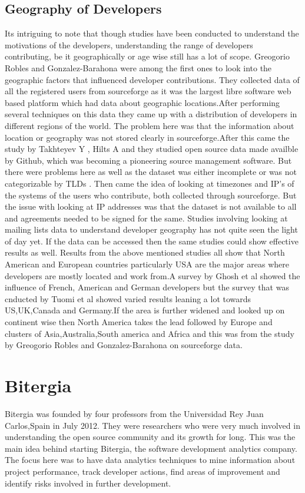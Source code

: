 \documentclass[double,12pt]{beavtex}
\begin{document}
\section{Geography of Developers}
Its intriguing to note that though studies have been conducted to understand the motivations of the developers, understanding the range of developers contributing, be it geographically or age wise still has a lot of scope. Greogorio Robles and Gonzalez-Barahona were among the first ones to look into the geographic factors that influenced developer contributions. They collected data of all the registered users from sourceforge as it was the largest libre software web based platform which had data about geographic locations.After performing several techniques on this data they came up with a distribution of developers in different regions of the world\cite{robles2006}. The problem here was that the information about location or geography was not stored clearly in sourceforge.After this came the study by Takhteyev Y , Hilts A and they studied open source data made availble by Github, which was becoming a pioneering source management software. But there were problems here as well as the dataset was either incomplete or was not categorizable by TLDs \cite{yuri2010}. Then came the idea of looking at timezones and IP's of the systems of the users who contribute, both collected through sourceforge. But the issue with looking at IP addresses was that the dataset is not available to all and agreements needed to be signed for the same\cite{von2010}. Studies involving looking at mailing lists data to understand developer geography has not quite seen the light of day yet. If the data can be accessed then the same studies could show effective results as well. Results from the above mentioned studies all show that North American and European countries particularly USA are the major areas where developers are mostly located and work from.A survey by Ghosh et al\cite{ghosh2005} showed the influence of French, American and German developers but the survey that was cnducted by Tuomi et al\cite{tuomi2004} showed varied results leaning a lot towards US,UK,Canada and Germany.If the area is further widened and looked up on continent wise then North America takes the lead followed by Europe and clusters of Asia,Australia,South america and Africa and this was from the study by Greogorio Robles and Gonzalez-Barahona on sourceforge data\cite{robles2006}.

\chapter{Bitergia}
Bitergia was founded by four professors from the 	
Universidad Rey Juan Carlos,Spain in July 2012. They were researchers who were very much involved in understanding the open source community and its growth for long. This was the main idea behind starting Bitergia, the software development analytics company. The focus here was to have data analytics techniques to mine information about project performance, track developer actions, find areas of improvement and identify risks involved in further development. 
\end{document}
